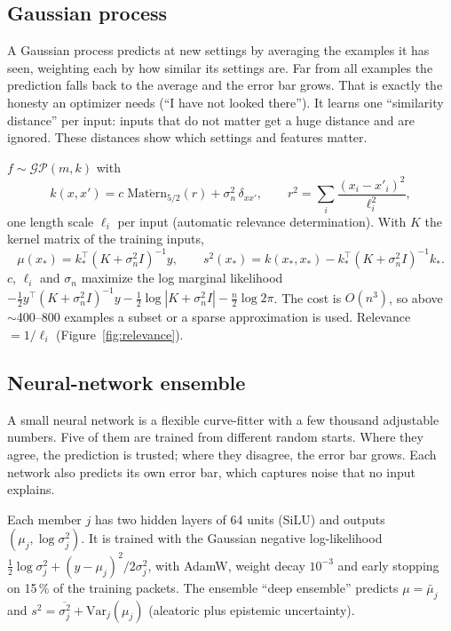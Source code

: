 \documentclass[10pt]{article}
\begin{document}
\subsection{Gaussian process}
\begin{basic}
A Gaussian process predicts at new settings by averaging the examples it has seen, weighting each by how similar its settings are.
Far from all examples the prediction falls back to the average and the error bar grows. That is exactly the honesty an optimizer needs
(``I have not looked there''). It learns one ``similarity distance'' per input: inputs that do not matter get a huge distance and are
ignored. These distances show which settings and features matter.
\end{basic}
\begin{advanced}
$f \sim \mathcal{GP}(m, k)$ with
\begin{equation}
k(x, x') = c\;\mathrm{Mat\acute ern}_{5/2}\!\left(r\right) + \sigma_n^2\,\delta_{xx'},\qquad
r^2 = \sum_i \frac{(x_i - x'_i)^2}{\ell_i^2},
\end{equation}
one length scale $\ell_i$ per input (automatic relevance determination). With $K$ the kernel matrix of the training inputs,
\begin{equation}
\mu(x_*) = k_*^\top (K + \sigma_n^2 I)^{-1} y,\qquad
s^2(x_*) = k(x_*, x_*) - k_*^\top (K + \sigma_n^2 I)^{-1} k_* .
\end{equation}
$c$, $\ell_i$ and $\sigma_n$ maximize the log marginal likelihood
$-\tfrac12 y^\top (K+\sigma_n^2 I)^{-1} y - \tfrac12 \log|K+\sigma_n^2 I| - \tfrac n2 \log 2\pi$. The cost is $O(n^3)$, so above
$\sim$400--800 examples a subset or a sparse approximation is used. Relevance $= 1/\ell_i$ (Figure~\ref{fig:relevance}).
\end{advanced}

\subsection{Neural-network ensemble}
\begin{basic}
A small neural network is a flexible curve-fitter with a few thousand adjustable numbers. Five of them are trained from different
random starts. Where they agree, the prediction is trusted; where they disagree, the error bar grows. Each network also predicts its
own error bar, which captures noise that no input explains.
\end{basic}
\begin{advanced}
Each member $j$ has two hidden layers of 64 units (SiLU) and outputs $(\mu_j, \log\sigma_j^2)$. It is trained with the Gaussian
negative log-likelihood $\tfrac12\log\sigma_j^2 + (y-\mu_j)^2/2\sigma_j^2$, with AdamW, weight decay $10^{-3}$ and early stopping on 15\,\%
of the training packets. The ensemble ``deep ensemble'' predicts $\mu = \bar\mu_j$ and
$s^2 = \overline{\sigma_j^2} + \mathrm{Var}_j(\mu_j)$ (aleatoric plus epistemic uncertainty).
\end{advanced}
\end{document}
